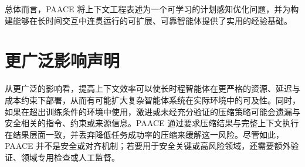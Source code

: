 \documentclass[10pt,twocolumn]{article}
\begin{document}
总体而言，PAACE 将上下文工程表述为一个可学习的计划感知优化问题，并为构建能够在长时间交互中连贯运行的可扩展、可靠智能体提供了实用的经验基础。

\section*{更广泛影响声明}

从更广泛的影响看，提高上下文效率可以使长时程智能体在更严格的资源、延迟与成本约束下部署，从而有可能扩大复杂智能体系统在实际环境中的可及性。同时，如果在超出训练条件的环境中使用，激进或未经充分验证的压缩策略可能会遗漏与安全相关的指令、约束或来源信息。PAACE 通过要求压缩结果与完整上下文执行在结果层面一致，并丢弃降低任务成功率的压缩来缓解这一风险。尽管如此，PAACE 并不是安全或对齐机制；若要用于安全关键或高风险领域，还需要额外验证、领域专用检查或人工监督。



\end{document}
